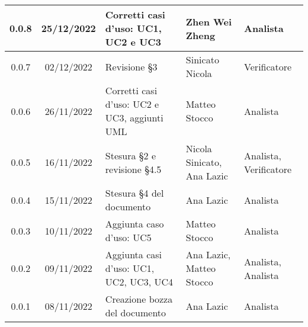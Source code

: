 \begin{center}
\begin{tabularx}{\textwidth}{| c | c | X | X | X |}
	\hline
	0.0.8 & 25/12/2022 & Corretti casi d'uso: UC1, UC2 e UC3 & Zhen Wei Zheng & Analista\\
	\hline
	0.0.7 & 02/12/2022 & Revisione §3 & Sinicato Nicola & Verificatore\\
	\hline
	0.0.6 & 26/11/2022 & Corretti casi d'uso: UC2 e UC3, aggiunti UML & Matteo Stocco & Analista\\
	\hline
	0.0.5 & 16/11/2022	 & Stesura §2 e revisione §4.5 & Nicola Sinicato, Ana Lazic & Analista, Verificatore\\
	\hline
	0.0.4 & 15/11/2022	 & Stesura §4 del documento & Ana Lazic & Analista\\
	\hline
	0.0.3 & 10/11/2022 & Aggiunta caso d’uso: UC5 & Matteo Stocco & Analista\\
	\hline
	0.0.2 & 09/11/2022	 & Aggiunta casi d’uso: UC1, UC2, UC3, UC4 & Ana Lazic, Matteo Stocco & Analista, Analista\\
	\hline
	0.0.1 & 08/11/2022 & Creazione bozza del documento & Ana Lazic & Analista\\
	\hline
\end{tabularx}		
\end{center}
